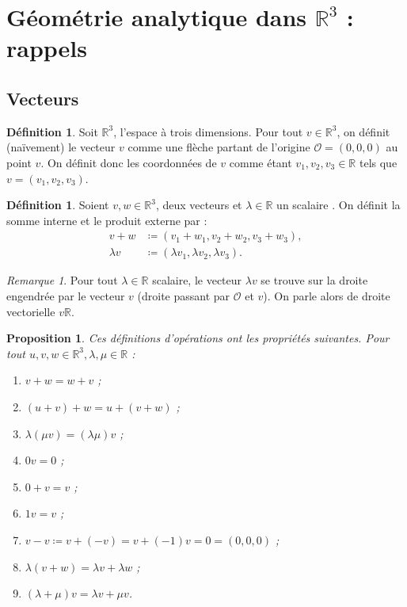\documentclass{article}
\newcommand{\R}{\mathbb R}
\newtheorem{prp}[thm]{Proposition}
\theoremstyle{definition}
\newtheorem{déf}[thm]{Définition}
\theoremstyle{remark}
\newtheorem*{rmq}{Remarque}
\begin{document}
\section{Géométrie analytique dans $\R^3$ : rappels}
	\subsection{Vecteurs}
		\begin{déf} Soit $\R^3$, l'espace à trois dimensions. Pour tout $v \in \R^3$, on définit (naïvement) le vecteur $v$ comme une flèche partant de l'origine
		$\mathcal O = (0, 0, 0)$ au point $v$. On définit donc les coordonnées de $v$ comme étant $v_1, v_2, v_3 \in \R$ tels que $v = (v_1, v_2, v_3)$. \end{déf}

		\begin{déf} Soient $v, w \in \R^3$, deux vecteurs et $\lambda \in \R$ un scalaire . On définit la somme interne et le produit externe par :
		\begin{align*}
			v+w &\coloneqq (v_1+w_1, v_2+w_2, v_3+w_3), \\
			\lambda v &\coloneqq (\lambda v_1, \lambda v_2, \lambda v_3).
		\end{align*}
		\end{déf}

		\begin{rmq} Pour tout $\lambda \in \R$ scalaire, le vecteur $\lambda v$ se trouve sur la droite engendrée par le vecteur $v$ (droite passant par $\mathcal O$ et $v$).
		On parle alors de droite vectorielle $v\R$. \end{rmq}

		\begin{prp} Ces définitions d'opérations ont les propriétés suivantes. Pour tout $u, v, w \in \R^3, \lambda, \mu \in \R$ :
		\begin{enumerate}
			\item $v+w = w+v$ ;
			\item $(u+v)+w = u+(v+w)$ ;
			\item $\lambda(\mu v) = (\lambda\mu)v$ ;
			\item $0v = 0$ ;
			\item $0 + v = v$ ;
			\item $1v = v$ ;
			\item $v - v \coloneqq v + (-v) = v + (-1)v = 0 = (0, 0, 0)$ ;
			\item $\lambda (v+w) = \lambda v + \lambda w$ ;
			\item $(\lambda + \mu) v = \lambda v + \mu v$.
		\end{enumerate}
		\end{prp}
\end{document}
